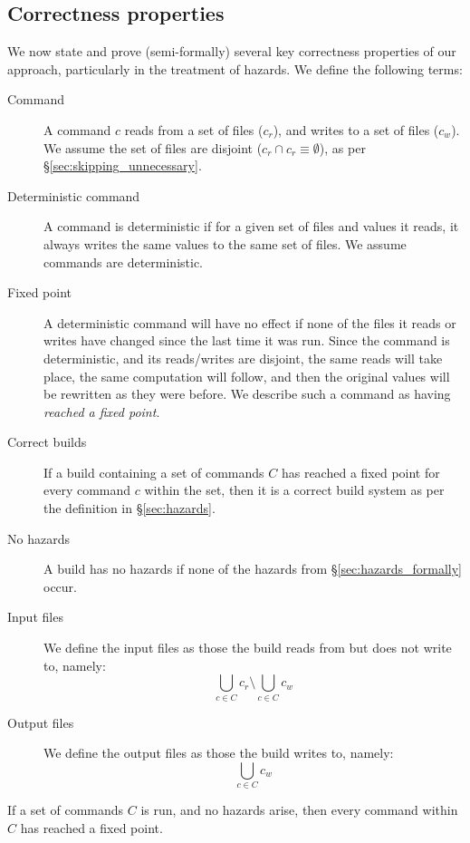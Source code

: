 \subsection{Correctness properties}
\label{sec:argument}
\label{sec:claims}

We now state and prove (semi-formally) several key correctness
properties of our approach, particularly in the treatment of hazards. We define the following terms:

\begin{description}
\item[Command] A command $c$ reads from a set of files ($c_r$), and writes to a set of files ($c_w$). We assume the set of files are disjoint ($c_r \cap c_r \equiv \emptyset$), as per \S\ref{sec:skipping_unnecessary}.
\item[Deterministic command] A command is deterministic if for a given set of files and values it reads, it always writes the same values to the same set of files. We assume commands are deterministic.
\item[Fixed point] A deterministic command will have no effect if none of the files it reads or writes have changed since the last time it was run. Since the command is deterministic, and its reads/writes are disjoint, the same reads will take place, the same computation will follow, and then the original values will be rewritten as they were before. We describe such a command as having \emph{reached a fixed point}.
\item[Correct builds] If a build containing a set of commands $C$ has reached a fixed point for every command $c$ within the set, then it is a correct build system as per the definition in \S\ref{sec:hazards}.
\item[No hazards] A build has no hazards if none of the hazards from \S\ref{sec:hazards_formally} occur.
\item[Input files] We define the input files as those the build reads from but does not write to, namely:
\[
  \bigcup_{c \in C} c_r \setminus \bigcup_{c \in C} c_w
\]
\item[Output files] We define the output files as those the build writes to, namely:
\[
  \bigcup_{c \in C} c_w
\]
\end{description}

\begin{claim}[Completeness] If a set of commands $C$ is run, and no hazards arise, then every command within $C$ has reached a fixed point.
  \label{claim:complete}
\end{claim}

